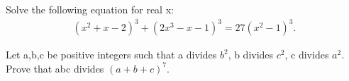 \item Solve the following equation for real x:
\begin{align*}
(x^{2} + x - 2)^{3} + (2x^{3} - x - 1)^{3} = 27(x^{2} - 1)^{3}.
\end{align*}

\item Let a,b,c be positive integers such that a divides $b^{2}$, b divides $c^{2}$, c divides $a^{2}$. Prove that abc divides $(a + b + c)^{7}$.

